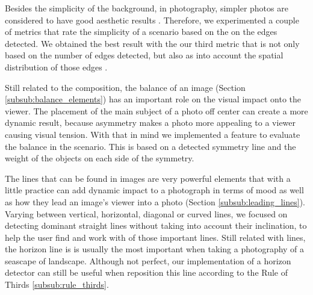 Besides the simplicity of the background, in photography, simpler photos are considered to have good aesthetic results \cite{kamps2012rules}. Therefore, we experimented a couple of metrics that rate the simplicity of a scenario based on the on the edges detected. We obtained the best result with the our third metric that is not only based on the number of edges detected, but also as into account the spatial distribution of those edges \cite{ke2006design}.

Still related to the composition, the balance of an image (Section \ref{subsub:balance_elements}) has an important role on the visual impact onto the viewer. The placement of the main subject of a photo off center can create a more dynamic result, because asymmetry makes a photo more appealing to a viewer causing visual tension. With that in mind we implemented a feature to evaluate the balance in the scenario. This is based on a detected symmetry line and the weight of the objects on each side of the symmetry.

The lines that can be found in images are very powerful elements that with a little practice can add dynamic impact to a photograph in terms of mood as well as how they lead an image’s viewer into a photo (Section \ref{subsub:leading_lines}). Varying between vertical, horizontal, diagonal or curved lines, we focused on detecting dominant straight lines without taking into account their inclination, to help the user find and work with of those important lines. Still related with lines, the horizon line is is usually the most important when taking a photography of a seascape of landscape. Although not perfect, our implementation of a horizon detector \cite{zafarifar2008horizon} can still be useful when reposition this line according to the Rule of Thirds \ref{subsub:rule_thirds}.